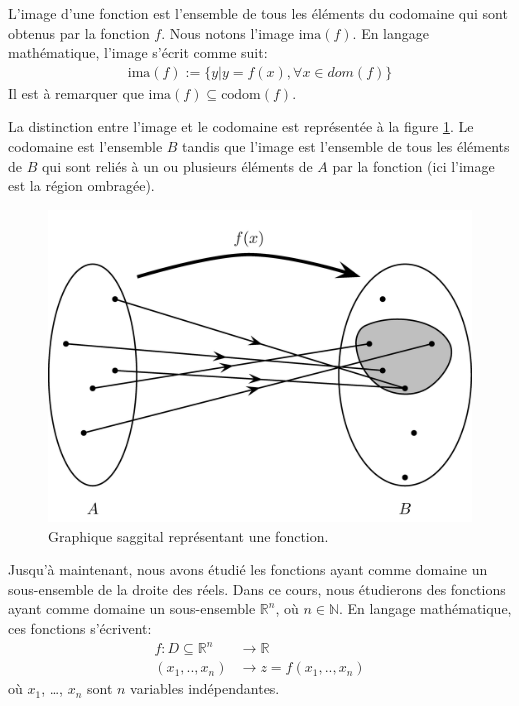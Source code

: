 \documentclass[]{book}
\theoremstyle{definition}
\theoremstyle{definition}
\theoremstyle{definition}
\theoremstyle{remark}
\let\BeginKnitrBlock\begin \let\EndKnitrBlock\end
\begin{document}
\BeginKnitrBlock{definition}[Image d'une fonction]
\protect\hypertarget{def:unnamed-chunk-120}{}{\label{def:unnamed-chunk-120}
{} }L'image d'une fonction est
l'ensemble de tous les éléments du codomaine qui sont obtenus par la
fonction \(f\). Nous notons l'image \(\text{ima}(f)\). En langage
mathématique, l'image s'écrit comme suit: \begin{align*}
\text{ima}(f):=\{y|y=f(x),\forall x\in dom(f)\}
\end{align*} Il est à remarquer que
\(\text{ima}(f)\subseteq \text{codom}(f)\).
\EndKnitrBlock{definition}

La distinction entre l'image et le codomaine est représentée à la figure
\ref{fig:representationfonction}. Le codomaine est l'ensemble \(B\)
tandis que l'image est l'ensemble de tous les éléments de \(B\) qui sont
reliés à un ou plusieurs éléments de \(A\) par la fonction (ici l'image
est la région ombragée).

\begin{figure}

{\centering \includegraphics[width=0.5\linewidth]{resources/images/latex/representationfonction} 

}

\caption{Graphique saggital représentant une fonction.}\label{fig:representationfonction}
\end{figure}

Jusqu'à maintenant, nous avons étudié les fonctions ayant comme domaine
un sous-ensemble de la droite des réels. Dans ce cours, nous étudierons
des fonctions ayant comme domaine un sous-ensemble \(\mathbb{R}^n\), où
\(n\in\mathbb{N}\). En langage mathématique, ces fonctions s'écrivent:
\begin{align*}
f: D\subseteq \mathbb{R}^n &\longrightarrow \mathbb{R}\\
(x_1,..,x_n)&\longrightarrow z=f(x_1,..,x_n)
\end{align*} où \(x_1\), \ldots{}, \(x_n\) sont \(n\) variables
indépendantes.
\end{document}
